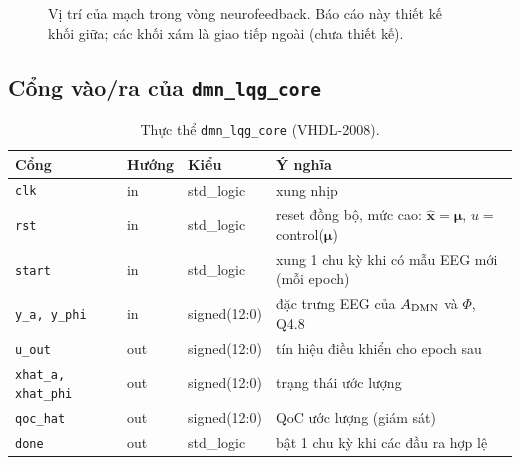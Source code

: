 \documentclass[11pt,a4paper]{article}
\newcommand{\QoC}{\mathrm{QoC}}
\newcommand{\xh}{\hat{\mathbf x}}
\newcommand{\code}[1]{\texttt{#1}}
\begin{document}
\begin{figure}[H]
\centering
{}
\caption{Vị trí của mạch trong vòng neurofeedback. Báo cáo này thiết kế khối giữa; các khối xám là giao tiếp
ngoài (chưa thiết kế).}
\label{fig:system}
\end{figure}

\subsection{Cổng vào/ra của \code{dmn\_lqg\_core}}

\begin{table}[H]
\centering\small
\caption{Thực thể \code{dmn\_lqg\_core} (VHDL-2008).}
\begin{tabular}{llll}
\toprule
Cổng & Hướng & Kiểu & Ý nghĩa \\
\midrule
\code{clk}      & in  & std\_logic         & xung nhịp \\
\code{rst}      & in  & std\_logic         & reset đồng bộ, mức cao: $\xh=\boldsymbol\mu$, $u=$ control($\boldsymbol\mu$) \\
\code{start}    & in  & std\_logic         & xung 1 chu kỳ khi có mẫu EEG mới (mỗi epoch) \\
\code{y\_a, y\_phi} & in & signed(12:0)    & đặc trưng EEG của $A_{\rm DMN}$ và $\Phi$, Q4.8 \\
\code{u\_out}   & out & signed(12:0)       & tín hiệu điều khiển cho epoch sau \\
\code{xhat\_a, xhat\_phi} & out & signed(12:0) & trạng thái ước lượng \\
\code{qoc\_hat} & out & signed(12:0)       & QoC ước lượng (giám sát) \\
\code{done}     & out & std\_logic         & bật 1 chu kỳ khi các đầu ra hợp lệ \\
\bottomrule
\end{tabular}
\end{table}
\end{document}
